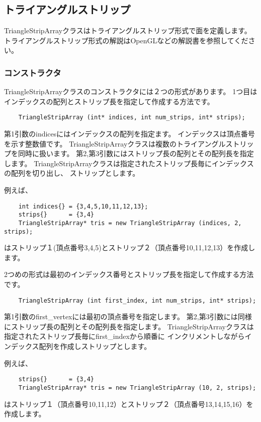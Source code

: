 
\subsection{トライアングルストリップ}

TriangleStripArrayクラスはトライアングルストリップ形式で面を定義します。
トライアングルストリップ形式の解説はOpenGLなどの解説書を参照してください。

\subsubsection{コンストラクタ}

TriangleStripArrayクラスのコンストラクタには２つの形式があります。
1つ目はインデックスの配列とストリップ長を指定して作成する方法です。

\begin{verbatim}
    TriangleStripArray (int* indices, int num_strips, int* strips);
\end{verbatim}

第1引数のindicesにはインデックスの配列を指定ます。
インデックスは頂点番号を示す整数値です。
TriangleStripArrayクラスは複数のトライアングルストリップを同時に扱います。
第2,第3引数にはストリップ長の配列とその配列長を指定します。
TriangleStripArrayクラスは指定されたストリップ長毎にインデックスの配列を切り出し、
ストリップとします。

例えば、

\begin{verbatim}
    int indices{} = {3,4,5,10,11,12,13};
    strips{}      = {3,4}
    TriangleStripArray* tris = new TriangleStripArray (indices, 2, strips);
\end{verbatim}

はストリップ１(頂点番号3,4,5)とストリップ２（頂点番号10,11,12,13）を作成します。

2つめの形式は最初のインデックス番号とストリップ長を指定して作成する方法です。


\begin{verbatim}
    TriangleStripArray (int first_index, int num_strips, int* strips);
\end{verbatim}

第1引数のfirst\_vertexには最初の頂点番号を指定します。
第2,第3引数には同様にストリップ長の配列とその配列長を指定します。
TriangleStripArrayクラスは指定されたストリップ長毎にfirst\_indexから順番に
インクリメントしながらインデックス配列を作成しストリップとします。

例えば、

\begin{verbatim}
    strips{}      = {3,4}
    TriangleStripArray* tris = new TriangleStripArray (10, 2, strips);
\end{verbatim}

はストリップ１（頂点番号10,11,12）とストリップ２（頂点番号13,14,15,16）を作成します。

